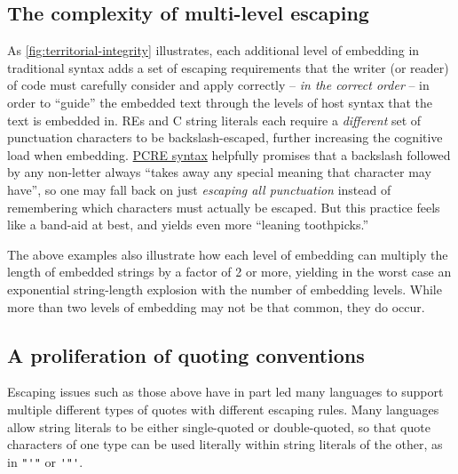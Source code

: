 \subsection{The complexity of multi-level escaping}

As \cref{fig:territorial-integrity} illustrates,
each additional level of embedding in traditional syntax
adds a set of escaping requirements that the writer (or reader) of code
must carefully consider and apply correctly --
\emph{in the correct order} --
in order to ``guide'' the embedded text
through the levels of host syntax that the text is embedded in.
REs and C string literals each require
a \emph{different} set of punctuation characters to be backslash-escaped,
further increasing the cognitive load when embedding.
\href{https://www.pcre.org/original/doc/html/pcrepattern.html}{PCRE syntax}
helpfully promises that a backslash followed by any non-letter
always ``takes away any special meaning that character may have'',
so one may fall back on just \emph{escaping all punctuation}
instead of remembering which characters must actually be escaped.
But this practice feels like a band-aid at best,
and yields even more ``leaning toothpicks.''

The above examples also illustrate how each level of embedding
can multiply the length of embedded strings by a factor of 2 or more,
yielding in the worst case
an exponential string-length explosion with the number of embedding levels.
While more than two levels of embedding may not be that common,
they do occur.


\subsection{A proliferation of quoting conventions}

Escaping issues such as those above have in part led many languages
to support multiple different types of quotes with different escaping rules.
Many languages allow string literals
to be either single-quoted or double-quoted,
so that quote characters of one type can be used literally
within string literals of the other,
as in \verb|"'"| or \verb|'"'|.

